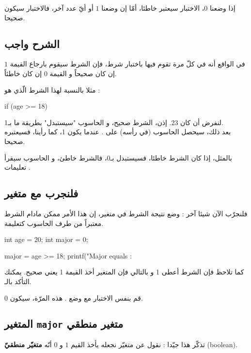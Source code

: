 إذا وضعنا $ 0 $، الاختبار سيعتبر خاطئا، أمّا إن وضعنا $ 1 $ أو أيّ عدد آخر، فالاختبار سيكون صحيحا.

\subsection{الشرح واجب}

في الواقع أنه في كلّ مرة تقوم فيها باختبار شرط، فإن الشرط سيقوم بارجاع القيمة $ 1 $ إن كان صحيحاً و القيمة $ 0 $ إن كان خاطئاً.

مثلا بالنسبة لهذا الشرط الّذي هو 
 :

\begin{Csource}
if (age >= 18)
\end{Csource}

لنفرض أن
كان 23. إذن، الشرط صحيح، و الحاسوب "سيستبدل" بطريقة ما
بـ1.\\
بعد ذلك، سيحصل الحاسوب (في رأسه) على
.
عندما يكون 1، كما رأينا، فسيعتبره صحيحا.

بالمثل، إذا كان الشرط خاطئا، فسيستبدل
بـ0، فالشرط خاطئ، و الحاسوب سيقرأ تعليمات
.

\subsection{فلنجرب مع متغير}

فلنجرّب الآن شيئا آخر : وضع نتيجة الشرط في متغير، إن هذا الأمر ممكن مادام الشرط معتبراً من طرف الحاسوب كتعليمة.

\begin{Csource}
int age = 20;
int major = 0;

major = age >= 18;
printf("Major equals : %
\end{Csource}

كما تلاحظ فإن الشرط
أعطى 1 و بالتالي فإن المتغير 
أخذ القيمة 1 يعني صحيح. يمكنك التأكد بالـ.

قم بنفس الاختبار مع وضع
.
هذه المرّة،
سيكون 0.

\subsection{المتغير
\texttt{major}
متغير منطقي}

تذكّر هذا جيّدا : نقول عن متغيّر نجعله يأخذ القيم $ 1 $ و $ 0 $ أنّه
\textbf{متغيّر منطقيّ}
(\textenglish{boolean}).

